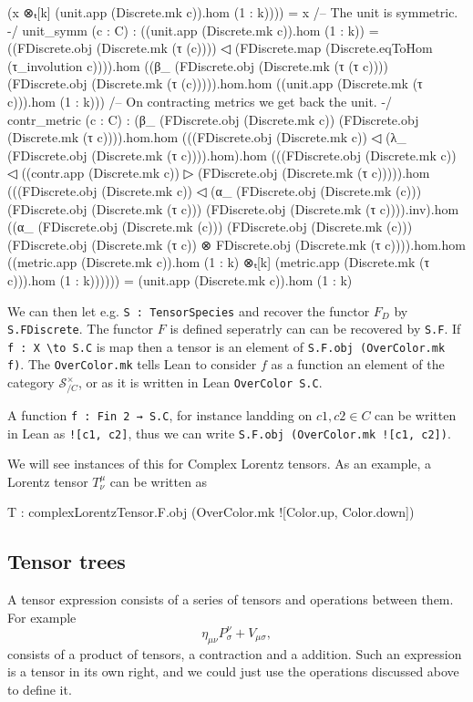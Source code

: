 \documentclass[a4paper, 11pt]{article}
\begin{document}
\begin{codeLong}
    (x ⊗ₜ[k] (unit.app (Discrete.mk c)).hom (1 : k)))) = x
  /-- The unit is symmetric. -/
  unit_symm (c : C) :
    ((unit.app (Discrete.mk c)).hom (1 : k)) =
    ((FDiscrete.obj (Discrete.mk (τ (c)))) ◁
      (FDiscrete.map (Discrete.eqToHom (τ_involution c)))).hom
    ((β_ (FDiscrete.obj (Discrete.mk (τ (τ c)))) (FDiscrete.obj (Discrete.mk (τ (c))))).hom.hom
    ((unit.app (Discrete.mk (τ c))).hom (1 : k)))
  /-- On contracting metrics we get back the unit. -/
  contr_metric (c : C) :
    (β_ (FDiscrete.obj (Discrete.mk c)) (FDiscrete.obj (Discrete.mk (τ c)))).hom.hom
    (((FDiscrete.obj (Discrete.mk c)) ◁ (λ_ (FDiscrete.obj (Discrete.mk (τ c)))).hom).hom
    (((FDiscrete.obj (Discrete.mk c)) ◁ ((contr.app (Discrete.mk c)) ▷
    (FDiscrete.obj (Discrete.mk (τ c))))).hom
    (((FDiscrete.obj (Discrete.mk c)) ◁ (α_ (FDiscrete.obj (Discrete.mk (c)))
      (FDiscrete.obj (Discrete.mk (τ c))) (FDiscrete.obj (Discrete.mk (τ c)))).inv).hom
    ((α_ (FDiscrete.obj (Discrete.mk (c))) (FDiscrete.obj (Discrete.mk (c)))
      (FDiscrete.obj (Discrete.mk (τ c)) ⊗ FDiscrete.obj (Discrete.mk (τ c)))).hom.hom
    ((metric.app (Discrete.mk c)).hom (1 : k) ⊗ₜ[k]
      (metric.app (Discrete.mk (τ c))).hom (1 : k))))))
    = (unit.app (Discrete.mk c)).hom (1 : k)
\end{codeLong}

We can then let e.g. \lstinline|S : TensorSpecies| and recover the functor $F_D$ 
by \lstinline|S.FDiscrete|. The functor $F$ is defined seperatrly can can be recovered
by \lstinline|S.F|. If \lstinline|f : X \to S.C| is map then a tensor is an element of 
\lstinline|S.F.obj (OverColor.mk f)|. The \lstinline|OverColor.mk| tells Lean to consider $f$ as 
a function an element of the category $\mathcal{S}_{/C}^\times$, or as it is written in Lean 
\lstinline|OverColor S.C|. 

A function \lstinline|f : Fin 2 → S.C|, for instance landding on $c1, c2 \in C$ can be written in 
Lean as \lstinline|![c1, c2]|, thus we can write \lstinline|S.F.obj (OverColor.mk ![c1, c2])|. 

We will see instances of this for Complex Lorentz tensors. As an example, a Lorentz tensor 
$T^\mu_\nu$ can be written as 
\begin{code}
T : complexLorentzTensor.F.obj (OverColor.mk ![Color.up, Color.down])
\end{code}

\subsection{Tensor trees} \label{sec:tensorTrees}
A tensor expression consists of a series of tensors and operations between them. 
For example 
\begin{equation}
  \eta_{\mu \nu}P^\nu_\sigma+ V_{\mu \sigma},
\end{equation}
consists of a product of tensors, a contraction and a addition. 
Such an expression is a tensor in its own right, and we could just use the operations discussed above 
to define it. 
\end{document}
